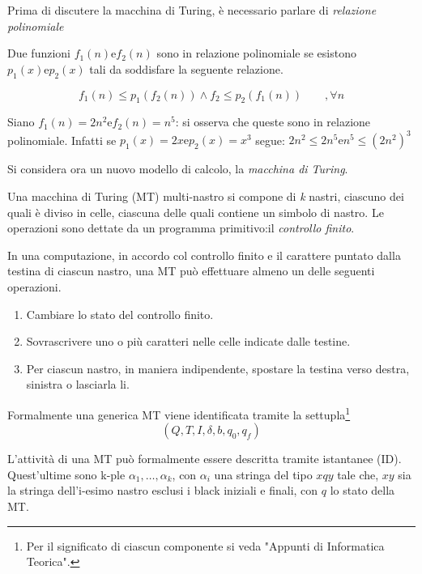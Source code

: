 \documentclass{subfiles}
\begin{document}
Prima di discutere la macchina di Turing, è necessario parlare di \emph{relazione polinomiale}
\begin{Definition*}
    Due funzioni \(f_{1}(n) \text{e} f_{2}(n)\) sono in relazione polinomiale se esistono \(p_{1}(x) \text{e} p_{2}(x)\) tali da soddisfare la seguente relazione.

    \[
        f_{1}(n) \le p_{1}(f_{2}(n)) \land f_{2} \le p_{2}(f_{1}(n)) \qquad , \forall n
    \]

    \begin{Example*}
        Siano \(f_{1}(n) = 2n^{2} \text{e} f_{2}(n) = n^{5}\): si osserva che queste sono in relazione polinomiale.
        Infatti se \(p_{1}(x) = 2x \text{e} p_{2}(x) = x^{3}\) segue: \(2n^{2} \le 2n^{5} \text{e} n^{5} \le (2n^{2})^{3}\)
    \end{Example*}
\end{Definition*}

Si considera ora un nuovo modello di calcolo, la \emph{macchina di Turing}.

\begin{Definition*}
    Una macchina di Turing (MT) multi-nastro si compone di \emph{k} nastri, ciascuno dei quali è diviso in celle, ciascuna delle quali contiene un simbolo di nastro.
    Le operazioni sono dettate da un programma primitivo:il \emph{controllo finito}.
\end{Definition*}

\noindent In una computazione, in accordo col controllo finito e il carattere puntato dalla testina di ciascun nastro, una MT può effettuare almeno un delle seguenti operazioni.
\begin{enumerate}
    \item Cambiare lo stato del controllo finito.
    \item Sovrascrivere uno o più caratteri nelle celle indicate dalle testine.
    \item Per ciascun nastro, in maniera indipendente, spostare la testina verso destra, sinistra o lasciarla li.
\end{enumerate}

Formalmente una generica MT viene identificata tramite la settupla\footnote[4]{Per il significato di ciascun componente si veda "Appunti di Informatica Teorica".}
\[
    (Q, T, I, \delta, b, q_{0}, q_{f})
\]

L'attività di una MT può formalmente essere descritta tramite istantanee (ID). Quest'ultime sono k-ple \(\alpha_{1}, \ldots, \alpha_{k}\),
con \(\alpha_{i}\) una stringa del tipo \(xqy\) tale che, \(xy\) sia la stringa dell'i-esimo nastro esclusi i black iniziali e finali, con \(q\) lo stato della MT.
\end{document}
